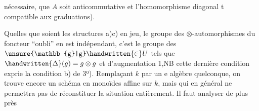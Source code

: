 nécessaire, que $A$ soit anticommutative et l'homomorphisme diagonal t compatible aux graduations).

\handwritten{9\unsure{/|)}} Quelles que soient les structures a)c) en jeu, le groupe des $\otimes$-automorphismes du foncteur  ``oubli'' en est indépendant, c'est le groupe des $\unsure{\mathbb{g}|g}\handwritten{\in}U$ tels que $\handwritten{\Delta}(g)=g\otimes g$ et d'augmentation 1,\unsure{(}NB cette dernière condition exprie la condition b) de 3º). Remplaçant $k$ par un e algèbre quelconque, on trouve encore un  schéma en monoïdes affine sur $k$, mais qui en général ne permettra pas de réconstituer la situation entièrement.  Il faut analyser de plus près
